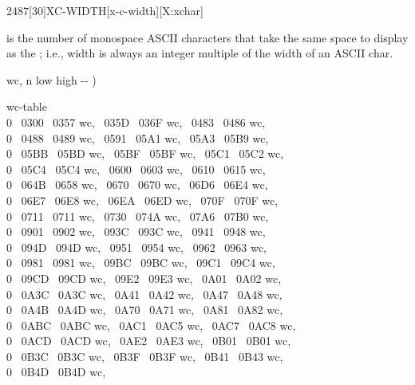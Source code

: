\newpage
\begin{worddef}{2487}[30]{XC-WIDTH}[x-c-width][X:xchar]
\item {}

	 is the number of monospace ASCII characters that take the same
	space to display as the ; i.e.,  width is always
	an integer multiple of the width of an ASCII char.

	\begin{implement}
	\word{:} wc,  n low high -{}- )   \word{,} \word{,} \word{,} \word{;}

	 wc-table   \\
	0 ~0300 ~0357 wc, ~035D ~036F wc, ~0483 ~0486 wc,\\
	0 ~0488 ~0489 wc, ~0591 ~05A1 wc, ~05A3 ~05B9 wc,\\
	0 ~05BB ~05BD wc, ~05BF ~05BF wc, ~05C1 ~05C2 wc,\\
	0 ~05C4 ~05C4 wc, ~0600 ~0603 wc, ~0610 ~0615 wc,\\
	0 ~064B ~0658 wc, ~0670 ~0670 wc, ~06D6 ~06E4 wc,\\
	0 ~06E7 ~06E8 wc, ~06EA ~06ED wc, ~070F ~070F wc,\\
	0 ~0711 ~0711 wc, ~0730 ~074A wc, ~07A6 ~07B0 wc,\\
	0 ~0901 ~0902 wc, ~093C ~093C wc, ~0941 ~0948 wc,\\
	0 ~094D ~094D wc, ~0951 ~0954 wc, ~0962 ~0963 wc,\\
	0 ~0981 ~0981 wc, ~09BC ~09BC wc, ~09C1 ~09C4 wc,\\
	0 ~09CD ~09CD wc, ~09E2 ~09E3 wc, ~0A01 ~0A02 wc,\\
	0 ~0A3C ~0A3C wc, ~0A41 ~0A42 wc, ~0A47 ~0A48 wc,\\
	0 ~0A4B ~0A4D wc, ~0A70 ~0A71 wc, ~0A81 ~0A82 wc,\\
	0 ~0ABC ~0ABC wc, ~0AC1 ~0AC5 wc, ~0AC7 ~0AC8 wc,\\
	0 ~0ACD ~0ACD wc, ~0AE2 ~0AE3 wc, ~0B01 ~0B01 wc,\\
	0 ~0B3C ~0B3C wc, ~0B3F ~0B3F wc, ~0B41 ~0B43 wc,\\
	0 ~0B4D ~0B4D wc,\tab[2]

\end{implement}
\end{worddef}
